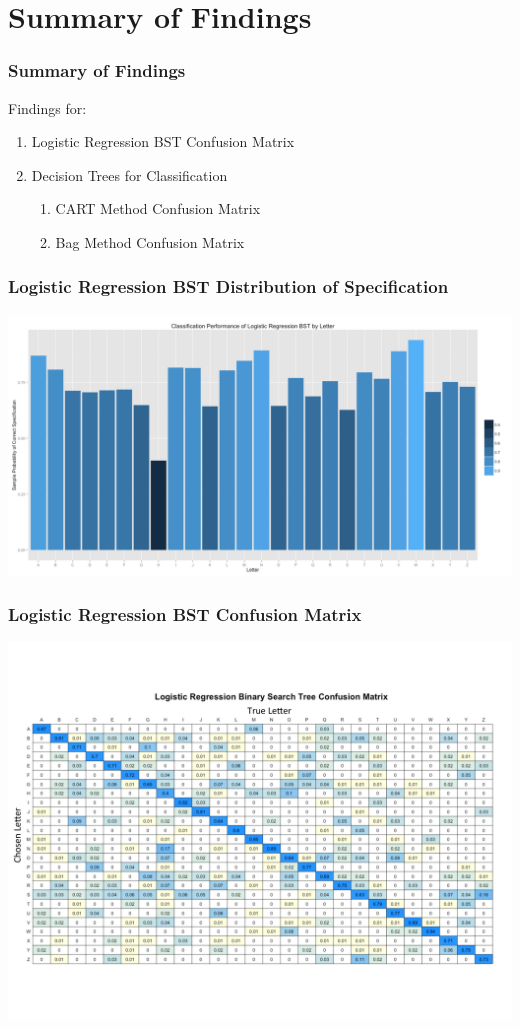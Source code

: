 \documentclass{beamer}
\begin{document}
\section{Summary of Findings}
\begin{frame}
\frametitle{Summary of Findings}
Findings for: 
\begin{enumerate}
\item Logistic Regression BST Confusion Matrix
\item Decision Trees for Classification
\begin{enumerate}
\item CART Method Confusion Matrix
\item Bag Method Confusion Matrix
\end{enumerate}
\end{enumerate}
\end{frame}


\begin{frame}
\frametitle{Logistic Regression BST Distribution of Specification}
\begin{center} 
\includegraphics[width=1 \textwidth]{hkMiss}
\end{center}
\end{frame}


\begin{frame}
\frametitle{Logistic Regression BST Confusion Matrix}
\begin{center} 
\includegraphics[width=1 \textwidth]{hkPercent}
\end{center}
\end{frame}
\end{document}
